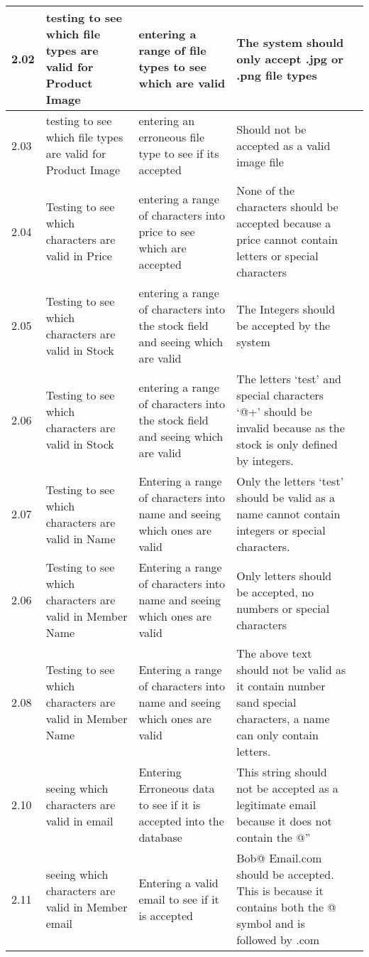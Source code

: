 \begin{flushleft}
\begin{longtable}{|p{1cm}|p{2.5cm}|p{2.5cm}|p{2cm}|p{2cm}|}
	2.02 & testing to see which file types are valid for Product Image & entering a range of file types to see which are valid & The system should only accept .jpg or .png file types & \\ \hline
	\rowcolor{dark-grey}2.03 & testing to see which file types are valid for Product Image & entering an erroneous file type to see if its accepted &  Should not be accepted as a valid image file & \\ \hline
	2.04 & Testing to see which characters are valid in Price & entering a range of characters into price to see which are accepted &  None of the characters should be accepted because a price cannot contain letters or special characters & \\ \hline
	2.05 & Testing to see which characters are valid in Stock & entering a range of characters into the stock field and seeing which are valid  & The Integers should be accepted by the system& \\ \hline
	\rowcolor{dark-grey}2.06 & Testing to see which characters are valid in Stock & entering a range of characters into the stock field and seeing which are valid  & The letters `test' and special characters `@+' should be invalid because as the stock is only defined by integers.& \\ \hline
	\rowcolor{dark-grey}2.07 & Testing to see which characters are valid in Name & Entering a range of characters into name and seeing which ones are valid  & Only the letters `test' should be valid as a name cannot contain integers or special characters.& \\ \hline
	\rowcolor{light-grey}2.06 & Testing to see which characters are valid in Member Name & Entering a range of characters into name and seeing which ones are valid  & Only letters should be accepted, no numbers or special characters& \\ \hline
	\rowcolor{dark-grey}2.08 & Testing to see which characters are valid in Member Name & Entering a range of characters into name and seeing which ones are valid &  The above text should not be valid as it contain number sand special characters, a name can only contain letters.& \\ \hline
	\rowcolor{dark-grey}2.10 & seeing which characters are valid in email & Entering Erroneous data to see if it is accepted into the database  &  This string should not be accepted as a legitimate email because it does not contain the @'' & \\ \hline
	\rowcolor{dark-grey}2.11 & seeing which characters are valid in Member email & Entering a valid email to see if it is accepted  &  Bob@ Email.com should be accepted. This is because it contains both the @ symbol and is followed by .com & \\ \hline

\end{longtable}
\end{flushleft}
